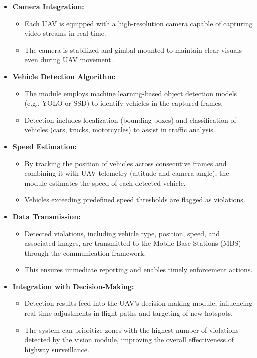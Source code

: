 \begin{itemize}
    \item \textbf{Camera Integration:} 
    \begin{itemize}
        \item Each UAV is equipped with a high-resolution camera capable of capturing video streams in real-time.
        \item The camera is stabilized and gimbal-mounted to maintain clear visuals even during UAV movement.
    \end{itemize}

    \item \textbf{Vehicle Detection Algorithm:} 
    \begin{itemize}
        \item The module employs machine learning-based object detection models (e.g., YOLO or SSD) to identify vehicles in the captured frames.
        \item Detection includes localization (bounding boxes) and classification of vehicles (cars, trucks, motorcycles) to assist in traffic analysis.
    \end{itemize}

    \item \textbf{Speed Estimation:} 
    \begin{itemize}
        \item By tracking the position of vehicles across consecutive frames and combining it with UAV telemetry (altitude and camera angle), the module estimates the speed of each detected vehicle.
        \item Vehicles exceeding predefined speed thresholds are flagged as violations.
    \end{itemize}

    \item \textbf{Data Transmission:} 
    \begin{itemize}
        \item Detected violations, including vehicle type, position, speed, and associated images, are transmitted to the Mobile Base Stations (MBS) through the communication framework.
        \item This ensures immediate reporting and enables timely enforcement actions.
    \end{itemize}

    \item \textbf{Integration with Decision-Making:} 
    \begin{itemize}
        \item Detection results feed into the UAV’s decision-making module, influencing real-time adjustments in flight paths and targeting of new hotspots.
        \item The system can prioritize zones with the highest number of violations detected by the vision module, improving the overall effectiveness of highway surveillance.
    \end{itemize}
\end{itemize}

